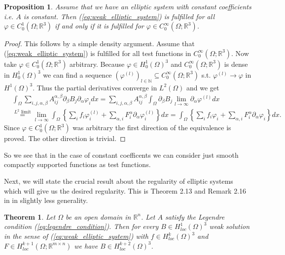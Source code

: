 \documentclass[12pt,a4paper]{article}
\numberwithin{equation}{subsection}
\numberwithin{lemma}{subsection}
\newtheorem{proposition}[lemma]{Proposition}
\newtheorem{theorem}[lemma]{Theorem}
\theoremstyle{definition}
\newcommand{\naturalnum}{\mathbb{N}}
\newcommand{\real}{\mathbb{R}}
\begin{document}
\begin{proposition}\label{prop:weak_solution_smooth_test_functions}
    Assume that we have an elliptic system with constant coefficients i.e. 
    $A$ is constant. Then
    (\ref{eq:weak_elliptic_system}) is fulfilled for all 
    $\varphi \in C^1_0(\Omega;\real^3)$ if and only if it is fulfilled 
    for $\varphi \in C^\infty_0(\Omega;\real^3)$.
\end{proposition}
\begin{proof}
    This follows by a simple density argument. Assume that 
    (\ref{eq:weak_elliptic_system}) is fulfilled for all test functions in 
    $C^\infty_0(\Omega;\real^3)$. Now take $\varphi \in C^1_0(\Omega;\real^3)$
    arbitrary. Because $\varphi \in H_0^1(\Omega)^3$ and 
    $C^\infty_0(\Omega;\real^3)$ is dense in $H_0^1(\Omega)^3$ we can find 
    a sequence $(\varphi^{(l)})_{l \in \naturalnum} \subseteq 
    C^\infty_0(\Omega;\real^3)$ s.t. $\varphi^{(l)} \rightarrow \varphi$
    in $H^1(\Omega)^3$. Thus the partial derivatives converge in $L^2(\Omega)$
    and we get
    \begin{align*}
        &\int_\Omega \sum\limits_{i,j,\alpha,\beta} 
            A_{ij}^{\alpha, \beta} \partial_\beta B_j \partial_\alpha \varphi_i
            dx
        = \sum\limits_{i,j,\alpha,\beta} A_{ij}^{\alpha, \beta}
            \int_\Omega \partial_\beta B_j \lim\limits_{l\rightarrow \infty} 
            \partial_\alpha \varphi^{(l)} dx
        \\ &\stackrel{\text{$L^2$ limit}}{=} 
            \lim\limits_{l\rightarrow \infty} 
            \int_\Omega \left\{ \sum\limits_i f_i \varphi^{(l)}_i + 
            \sum\limits_{\alpha,i} F_i^\alpha \partial_\alpha \varphi^{(l)}_i 
            \right\} dx
        = \int_\Omega \left\{ \sum\limits_i f_i \varphi_i + 
            \sum\limits_{\alpha,i} F_i^\alpha \partial_\alpha \varphi_i 
            \right\} dx.
    \end{align*}
    Since $\varphi \in C_0^1(\Omega;\real^3)$ was arbitrary the first 
    direction of the equivalence is proved. The other direction is trivial.
\end{proof}
So we see that in the case of constant coefficents we can consider 
just smooth compactly supported functions as test functions.

Next, we will state the crucial result about the regularity of elliptic systems
which will give us the desired regularity. This is Theorem 2.13 and Remark 2.16 
in \cite{lectures_on_elliptic_pdes} in slightly less generality.
\begin{theorem}\label{thm:regularity_elliptic_systems}
    Let $\Omega$ be an open domain in $\real^n$. Let $A$ 
    satisfy the Legendre condition (\ref{eq:legendre_condition}). Then for every 
    $B \in H^1_{loc}(\Omega)^3$ weak solution in the sense of
    (\ref{eq:weak_elliptic_system}) with $f \in H^k_{loc}(\Omega)^3$ and 
    $F \in H^{k+1}_{loc}(\Omega;\real^{m\times n})$ 
    we have $B \in H^{k+2}_{loc}(\Omega)^3$. 
\end{theorem}
\end{document}
